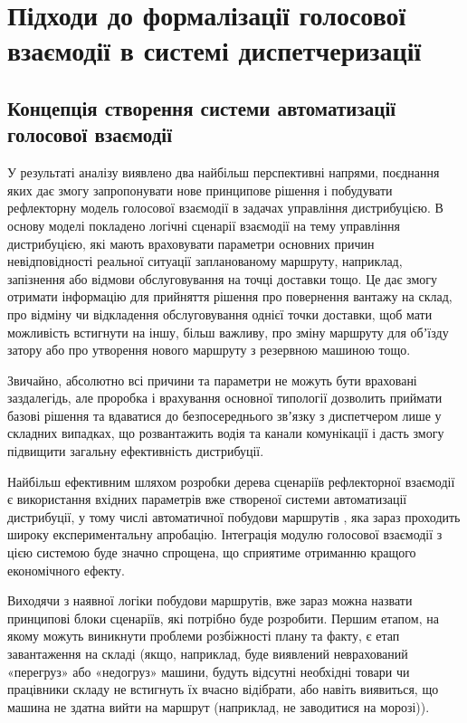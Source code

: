 \chapter{Підходи до формалізації голосової взаємодії в системі диспетчеризації} \label{chapt2}

\section{Концепція створення системи автоматизації голосової взаємодії} \label{sect2_1}

У результаті аналізу виявлено два найбільш перспективні напрями, поєднання яких дає змогу запропонувати нове принципове рішення і побудувати рефлекторну модель голосової взаємодії в задачах управління дистрибуцією. В основу моделі покладено логічні сценарії взаємодії на тему управління дистрибуцією, які мають враховувати параметри основних причин невідповідності реальної ситуації запланованому маршруту, наприклад, запізнення або відмови обслуговування на точці доставки тощо. Це дає змогу отримати інформацію для прийняття рішення про повернення вантажу на склад, про відміну чи відкладення обслуговування однієї точки доставки, щоб мати можливість встигнути на іншу, більш важливу, про зміну маршруту для обʼїзду затору або про утворення нового маршруту з резервною машиною тощо.

Звичайно, абсолютно всі причини та параметри не можуть бути враховані заздалегідь, але проробка і врахування основної типології дозволить приймати базові рішення та вдаватися до безпосереднього звʼязку з диспетчером лише у складних випадках, що розвантажить водія та канали комунікації і дасть змогу підвищити загальну ефективність дистрибуції.

Найбільш ефективним шляхом розробки дерева сценаріїв рефлекторної взаємодії є використання вхідних параметрів вже створеної системи автоматизації дистрибуції, у тому числі автоматичної побудови маршрутів \cite{as6}, яка зараз проходить широку експериментальну апробацію. Інтеграція модулю голосової взаємодії з цією системою буде значно спрощена, що сприятиме отриманню кращого економічного ефекту.

Виходячи з наявної логіки побудови маршрутів, вже зараз можна назвати принципові блоки сценаріїв, які потрібно буде розробити. Першим етапом, на якому можуть виникнути проблеми розбіжності плану та факту, є етап завантаження на складі (якщо, наприклад, буде виявлений неврахований «перегруз» або «недогруз» машини, будуть відсутні необхідні товари чи працівники складу не встигнуть їх вчасно відібрати, або навіть виявиться, що машина не здатна вийти на маршрут (наприклад, не заводитися на морозі)).

